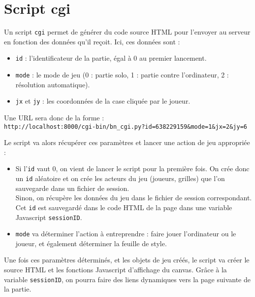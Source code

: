 \section{Script cgi}
Un script \texttt{cgi} permet de générer du code source HTML pour l'envoyer au serveur en fonction des données qu'il reçoit. Ici, ces données sont :
\begin{itemize}
\item \texttt{id} : l'identificateur de la partie, égal à 0 au premier lancement.
\item \texttt{mode} : le mode de jeu (0 : partie solo, 1 : partie contre l'ordinateur, 2 : résolution automatique).
\item \texttt{jx} et \texttt{jy} : les coordonnées de la case cliquée par le joueur. 
\end{itemize}
Une URL sera donc de la forme :\\
\texttt{http://localhost:8000/cgi-bin/bn\_cgi.py?id=638229159\&mode=1\&jx=2\&jy=6}

Le script va alors récupérer ces paramètres et lancer une action de jeu appropriée : 
\begin{itemize}
\item Si l'\texttt{id} vaut 0, on vient de lancer le script pour la première fois. On crée donc un \texttt{id} aléatoire et on crée les acteurs du jeu (joueurs, grilles) que l'on sauvegarde dans un fichier de session.\\
Sinon, on récupère les données du jeu dans le fichier de session correspondant.\\
Cet \texttt{id} est sauvegardé dans le code HTML de la page dans une variable Javascript \texttt{sessionID}.
\item \texttt{mode} va déterminer l'action à entreprendre : faire jouer l'ordinateur ou le joueur, et également déterminer la feuille de style.
\end{itemize}

Une fois ces paramètres déterminés, et les objets de jeu créés, le script va créer le source HTML et les fonctions Javascript d'affichage du canvas. Grâce à la variable \texttt{sessionID}, on pourra faire des liens dynamiques vers la page suivante de la partie. 